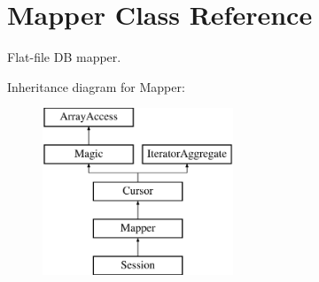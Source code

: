 \hypertarget{class_d_b_1_1_jig_1_1_mapper}{}\section{Mapper Class Reference}
\label{class_d_b_1_1_jig_1_1_mapper}


Flat-\/file DB mapper.  


Inheritance diagram for Mapper\+:\begin{figure}[H]
\begin{center}
\leavevmode
\includegraphics[height=5.000000cm]{class_d_b_1_1_jig_1_1_mapper}
\end{center}
\end{figure}

